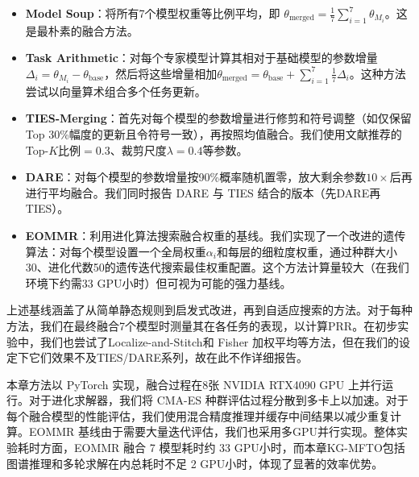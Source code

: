\documentclass[../main.tex]{subfiles}
\begin{document}
\begin{itemize}[leftmargin=3\ccwd]
	\item \textbf{Model Soup}\cite{modelsoupsaveraging_wortsman_2022}：将所有7个模型权重等比例平均，即 $\theta_{\text{merged}} = \frac{1}{7}\sum_{i=1}^{7}\theta_{M_i}$。这是最朴素的融合方法。
	\item \textbf{Task Arithmetic}\cite{editingmodelstask_ilharco_2023}：对每个专家模型计算其相对于基础模型的参数增量$\Delta_i=\theta_{M_i}-\theta_{\text{base}}$，然后将这些增量相加$\theta_{\text{merged}}=\theta_{\text{base}} + \sum_{i=1}^7 \frac{1}{7}\Delta_i$。这种方法尝试以向量算术组合多个任务更新。
	\item \textbf{TIES-Merging}\cite{tiesmergingresolving_yadav_2023}：首先对每个模型的参数增量进行修剪和符号调整（如仅保留Top 30\%幅度的更新且令符号一致），再按照均值融合。我们使用文献推荐的Top-$K$比例$=0.3$、裁剪尺度$\lambda=0.4$等参数。
	\item \textbf{DARE}\cite{mergekit_github}：对每个模型的参数增量按90\%概率随机置零，放大剩余参数$10\times$后再进行平均融合。我们同时报告 DARE 与 TIES 结合的版本（先DARE再TIES）。
	\item \textbf{EOMMR}：利用进化算法搜索融合权重的基线。我们实现了一个改进的遗传算法：对每个模型设置一个全局权重$\alpha_i$和每层的细粒度权重，通过种群大小30、进化代数50的遗传迭代搜索最佳权重配置。这个方法计算量较大（在我们环境下约需33 GPU小时）但可视为可能的强力基线。
\end{itemize}

上述基线涵盖了从简单静态规则到启发式改进，再到自适应搜索的方法。对于每种方法，我们在最终融合7个模型时测量其在各任务的表现，以计算PRR。在初步实验中，我们也尝试了Localize-and-Stitch和 Fisher 加权平均等方法，但在我们的设定下它们效果不及TIES/DARE系列，故在此不作详细报告。


本章方法以 PyTorch 实现，融合过程在8张 NVIDIA RTX4090 GPU 上并行运行。对于进化求解器，我们将 CMA-ES 种群评估过程分散到多卡上以加速。对于每个融合模型的性能评估，我们使用混合精度推理并缓存中间结果以减少重复计算。EOMMR 基线由于需要大量迭代评估，我们也采用多GPU并行实现。整体实验耗时方面，EOMMR 融合 7 模型耗时约 33 GPU小时，而本章KG-MFTO包括图谱推理和多轮求解在内总耗时不足 2 GPU小时，体现了显著的效率优势。

\label{sec:ch5-6-2-fusion-performance-comparison}
\end{document}
